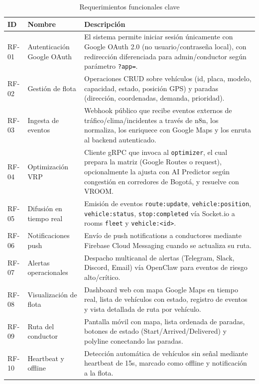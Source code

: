 \documentclass[12pt,a4paper,oneside]{article}
\begin{document}
\begin{table}[H]
\centering
\caption{Requerimientos funcionales clave}
\label{tab:rf-clave}
\small
\begin{tabularx}{\textwidth}{p{1.3cm} p{4cm} X}
\toprule
\textbf{ID} & \textbf{Nombre} & \textbf{Descripci\'on} \\
\midrule
RF-01 & Autenticaci\'on Google OAuth & El sistema permite iniciar sesi\'on \'unicamente con Google OAuth 2.0 (no usuario/contrase\~na local), con redirecci\'on diferenciada para admin/conductor seg\'un par\'ametro \texttt{?app=}. \\
RF-02 & Gesti\'on de flota & Operaciones CRUD sobre veh\'iculos (id, placa, modelo, capacidad, estado, posici\'on GPS) y paradas (direcci\'on, coordenadas, demanda, prioridad). \\
RF-03 & Ingesta de eventos & Webhook p\'ublico que recibe eventos externos de tr\'afico/clima/incidentes a trav\'es de n8n, los normaliza, los enriquece con Google Maps y los enruta al backend autenticado. \\
RF-04 & Optimizaci\'on VRP & Cliente gRPC que invoca al \texttt{optimizer}, el cual prepara la matriz (Google Routes o request), opcionalmente la ajusta con AI Predictor seg\'un congesti\'on en corredores de Bogot\'a, y resuelve con VROOM. \\
RF-05 & Difusi\'on en tiempo real & Emisi\'on de eventos \texttt{route:update}, \texttt{vehicle:position}, \texttt{vehicle:status}, \texttt{stop:completed} v\'ia Socket.io a rooms \texttt{fleet} y \texttt{vehicle:<id>}. \\
RF-06 & Notificaciones push & Env\'io de push notifications a conductores mediante Firebase Cloud Messaging cuando se actualiza su ruta. \\
RF-07 & Alertas operacionales & Despacho multicanal de alertas (Telegram, Slack, Discord, Email) v\'ia OpenClaw para eventos de riesgo alto/cr\'itico. \\
RF-08 & Visualizaci\'on de flota & Dashboard web con mapa Google Maps en tiempo real, lista de veh\'iculos con estado, registro de eventos y vista detallada de ruta por veh\'iculo. \\
RF-09 & Ruta del conductor & Pantalla m\'ovil con mapa, lista ordenada de paradas, botones de estado (Start/Arrived/Delivered) y polyline conectando las paradas. \\
RF-10 & Heartbeat y offline & Detecci\'on autom\'atica de veh\'iculos sin se\~nal mediante heartbeat de 15s, marcado como offline y notificaci\'on a la flota. \\
\bottomrule
\end{tabularx}
\end{table}
\end{document}
